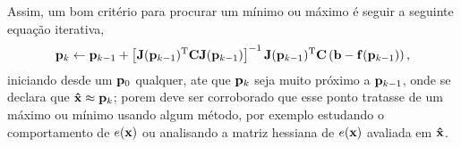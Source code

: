 \begin{myproofT}
Assim, um bom critério para procurar um mínimo ou máximo é seguir a seguinte 
equação iterativa,
\begin{equation}\label{eq:proof:minfxbCfxb3}
\VECTOR{p}_{k} \leftarrow \VECTOR{p}_{k-1} +
\left[ \MATRIX{J}(\VECTOR{p}_{k-1})^{\transpose}\MATRIX{C} \MATRIX{J}(\VECTOR{p}_{k-1}) \right]^{-1}
\MATRIX{J}(\VECTOR{p}_{k-1})^{\transpose}\MATRIX{C} \left(\VECTOR{b}-\VECTOR{f}(\VECTOR{p}_{k-1})\right),
\end{equation}
iniciando desde um $\VECTOR{p}_{0}$ qualquer, ate que $\VECTOR{p}_{k}$ seja muito próximo a $\VECTOR{p}_{k-1}$,
onde se declara que $\VECTOR{\hat{x}} \approx \VECTOR{p}_{k}$; porem deve ser corroborado
que esse ponto tratasse de um máximo ou mínimo usando algum método, por exemplo estudando o comportamento 
de $e(\VECTOR{x})$ ou analisando a matriz hessiana de $e(\VECTOR{x})$ avaliada em $\VECTOR{\hat{x}}$.
\end{myproofT}


